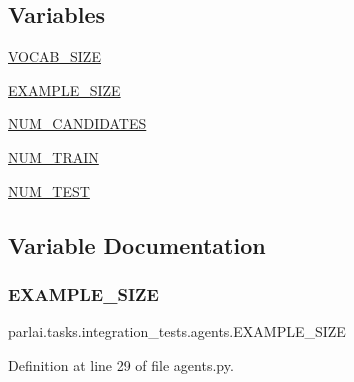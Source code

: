 \subsection*{Variables}
\begin{DoxyCompactItemize}
\item 
\hyperlink{namespaceparlai_1_1tasks_1_1integration__tests_1_1agents_a5cd37acf932f9435e0755b6c00c90f65}{V\+O\+C\+A\+B\+\_\+\+S\+I\+ZE}
\item 
\hyperlink{namespaceparlai_1_1tasks_1_1integration__tests_1_1agents_ab401aeabf1a74e6ad6466a5c0b87ac70}{E\+X\+A\+M\+P\+L\+E\+\_\+\+S\+I\+ZE}
\item 
\hyperlink{namespaceparlai_1_1tasks_1_1integration__tests_1_1agents_a8fcc41db4eba1091d4ecd3f2b505dc5c}{N\+U\+M\+\_\+\+C\+A\+N\+D\+I\+D\+A\+T\+ES}
\item 
\hyperlink{namespaceparlai_1_1tasks_1_1integration__tests_1_1agents_a48ed2e54c9c2848117b41051e49c2721}{N\+U\+M\+\_\+\+T\+R\+A\+IN}
\item 
\hyperlink{namespaceparlai_1_1tasks_1_1integration__tests_1_1agents_a08ec6b0895f06a6adf9c1f0a45240ad3}{N\+U\+M\+\_\+\+T\+E\+ST}
\end{DoxyCompactItemize}


\subsection{Variable Documentation}
\mbox{\label{namespaceparlai_1_1tasks_1_1integration__tests_1_1agents_ab401aeabf1a74e6ad6466a5c0b87ac70}} 
\subsubsection{\texorpdfstring{E\+X\+A\+M\+P\+L\+E\+\_\+\+S\+I\+ZE}{EXAMPLE\_SIZE}}
{\footnotesize\ttfamily parlai.\+tasks.\+integration\+\_\+tests.\+agents.\+E\+X\+A\+M\+P\+L\+E\+\_\+\+S\+I\+ZE}



Definition at line 29 of file agents.\+py.

\mbox{\label{namespaceparlai_1_1tasks_1_1integration__tests_1_1agents_a8fcc41db4eba1091d4ecd3f2b505dc5c}} 
